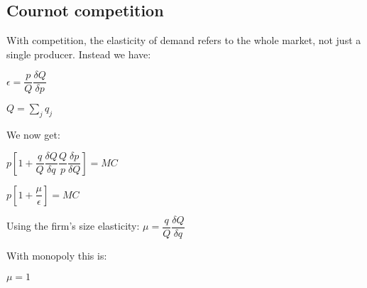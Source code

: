 
\subsection{Cournot competition}

With competition, the elasticity of demand refers to the whole market, not just a single producer. Instead we have:

\(\epsilon = \dfrac{p}{Q}\dfrac{\delta Q}{\delta p}\)

\(Q=\sum_j q_j\)

We now get:

\(p[1+\dfrac{q}{Q}\dfrac{\delta Q}{\delta q}\dfrac{Q}{p}\dfrac{\delta p}{\delta Q}]=MC\)

\(p[1+\dfrac{\mu }{\epsilon }]=MC\)

Using the firm's size elasticity: \(\mu = \dfrac{q}{Q}\dfrac{\delta Q}{\delta q}\)

With monopoly this is:

\(\mu = 1\)

